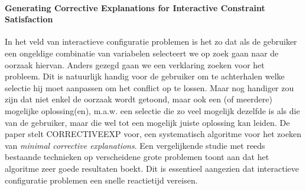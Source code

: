 \paragraph{Generating Corrective Explanations for Interactive Constraint Satisfaction \cite{o2005generating}}
In het veld van interactieve configuratie problemen is het zo dat als de gebruiker een ongeldige combinatie van variabelen selecteert we op zoek gaan naar de oorzaak hiervan. Anders gezegd gaan we een verklaring zoeken voor het probleem. Dit is natuurlijk handig voor de gebruiker om te achterhalen welke selectie hij moet aanpassen om het conflict op te lossen. Maar nog handiger zou zijn dat niet enkel de oorzaak wordt getoond, maar ook een (of meerdere) mogelijke oplossing(en), m.a.w. een selectie die zo veel mogelijk dezelfde is als die van de gebruiker, maar die wel tot een mogelijk juiste oplossing kan leiden. De paper stelt CORRECTIVEEXP voor, een systematisch algoritme voor het zoeken van \emph{minimal corrective explanations}. Een vergelijkende studie met reeds bestaande technieken op verscheidene grote problemen toont aan dat het algoritme zeer goede resultaten boekt. Dit is essentieel aangezien dat interactieve configuratie problemen een snelle reactietijd vereisen.
